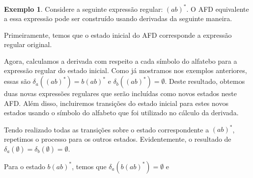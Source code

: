 \documentclass[a4paper]{article}
\theoremstyle{definition}
\newtheorem{Example}{Exemplo}
\begin{document}
  \begin{Example}
    Considere a seguinte expressão regular: $(ab)^*$. O AFD equivalente a essa
    expressão pode ser construído usando derivadas da seguinte maneira.

    Primeiramente, temos que o estado inicial do AFD corresponde a expressão
    regular original.

    \begin{figure}[H]
      \centering
    \end{figure}

    Agora, calculamos a derivada com respeito a cada símbolo do alfatebo para
    a expressão regular do estado inicial. Como já mostramos nos exemplos
    anteriores, essas são $\delta_a((ab)^*) = b(ab)^*$ e
    $\delta_b((ab)^*) = \emptyset$. Deste resultado, obtemos duas novas
    expressões regulares que serão incluídas como novos estados neste AFD.
    Além disso, incluiremos transições do estado inicial para estes novos
    estados usando o símbolo do alfabeto que foi utilizado no cálculo
    da derivada.
    \begin{figure}[H]
      \centering
    \end{figure}
    Tendo realizado todas as transições sobre o estado correspondente a
    $(ab)^*$, repetimos o processo para os outros estados. Evidentemente, o
    resultado de $\delta_a(\emptyset) = \delta_b(\emptyset) = \emptyset$.
    \begin{figure}[H]
      \centering
    \end{figure}
    Para o estado $b(ab)^*$, temos que $\delta_a(b(ab)^*) = \emptyset$ e

\end{Example}
\end{document}
